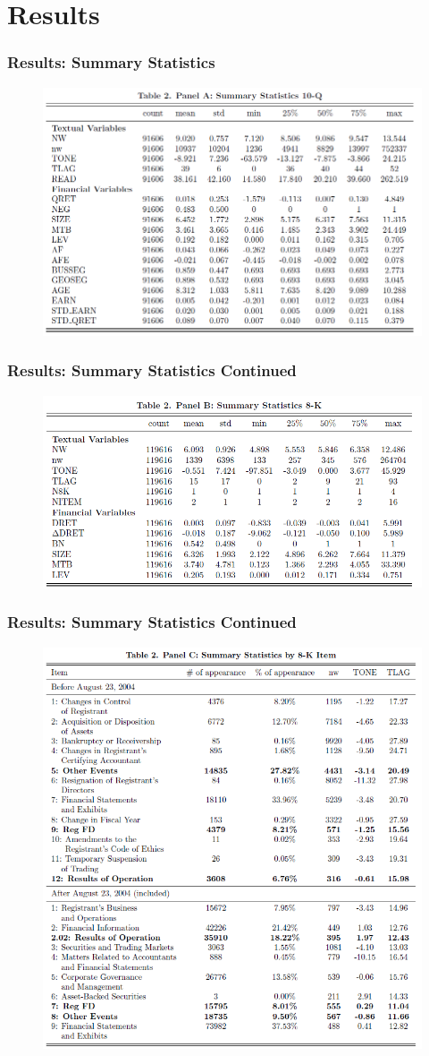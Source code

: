 \documentclass{beamer}
\begin{document}
\section{Results}
\begin{frame}
\frametitle{Results: Summary Statistics}
\begin{figure}[h]
	\centering
	\includegraphics[width=0.65\linewidth]{tab2panA}
	\label{tab2panA}
\end{figure}

\end{frame}
\begin{frame}
	\frametitle{Results: Summary Statistics Continued}
	\begin{figure}[h]
		\centering
		\includegraphics[width=0.65\linewidth]{tab2panB}
		\label{tab2panB}
	\end{figure}
	
\end{frame}
\begin{frame}
	\frametitle{Results: Summary Statistics Continued}
	\begin{figure}[h]
		\centering
		\includegraphics[width=0.55\linewidth]{tab2panC}
		\label{tab2panC}
	\end{figure}
	
\end{frame}
\end{document}
